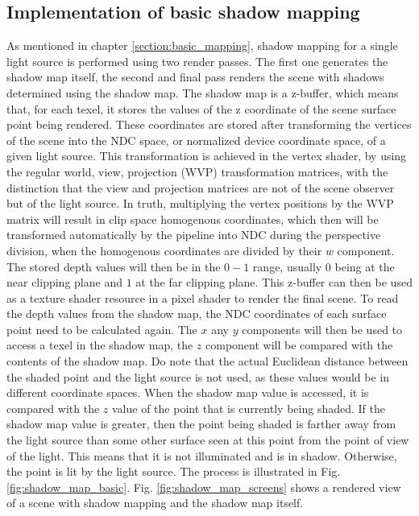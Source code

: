 \subsection{Implementation of basic shadow mapping}
\label{section:basic_mapping_impl}
As mentioned in chapter \ref{section:basic_mapping}, shadow mapping for a single light source is performed using two render passes. The first one generates the shadow map itself, the second and final pass renders the scene with shadows determined using the shadow map. The shadow map is a z-buffer, which means that, for each texel, it stores the values of the z coordinate of the scene surface point being rendered. These coordinates are stored after transforming the vertices of the scene into the NDC space, or normalized device coordinate space, of a given light source. This transformation is achieved in the vertex shader, by using the regular world, view, projection (WVP) transformation matrices, with the distinction that the view and projection matrices are not of the scene observer but of the light source. In truth, multiplying the vertex positions by the WVP matrix will result in clip space homogenous coordinates, which then will be transformed automatically by the pipeline into NDC during the perspective division, when the homogenous coordinates are divided by their \(w\) component. The stored depth values will then be in the \(0-1\) range, usually \(0\) being at the near clipping plane and \(1\) at the far clipping plane. This z-buffer can then be used as a texture shader resource in a pixel shader to render the final scene. To read the depth values from the shadow map, the NDC coordinates of each surface point need to be calculated again. The \(x\) any \(y\) components will then be used to access a texel in the shadow map, the \(z\) component will be compared with the contents of the shadow map. Do note that the actual Euclidean distance between the shaded point and the light source is not used, as these values would be in different coordinate spaces. When the shadow map value is accessed, it is compared with the \(z\) value of the point that is currently being shaded. If the shadow map value is greater, then the point being shaded is farther away from the light source than some other surface seen at this point from the point of view of the light. This means that it is not illuminated and is in shadow. Otherwise, the point is lit by the light source. The process is illustrated in Fig. \ref{fig:shadow_map_basic}. Fig. \ref{fig:shadow_map_screens} shows a rendered view of a scene with shadow mapping and the shadow map itself.


